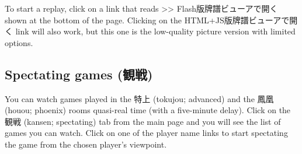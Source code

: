 \bigskip
To start a replay, click on a link that reads >> Flash版牌譜ビューアで開く shown at the bottom of the page. Clicking on the HTML+JS版牌譜ビューアで開く link will also work, but this one is the low-quality picture version with limited options. 

\subsection{Spectating games (観戦)}
You can watch games played in the 特上 ({\jap tokujou}; advanced) and the 鳳凰 ({\jap houou}; phoenix) rooms quasi-real time (with a five-minute delay). Click on the 観戦 ({\jap kansen}; spectating) tab from the main page and you will see the list of games you can watch. Click on one of the player name links to start spectating the game from the chosen player's viewpoint. 

